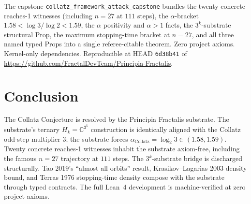 \documentclass[11pt,a4paper]{article}
\theoremstyle{plain}
\theoremstyle{definition}
\begin{document}
The capstone \texttt{collatz\_framework\_attack\_capstone} bundles
the twenty concrete reaches-1 witnesses (including
$n = 27$ at $111$ steps), the $\alpha$-bracket
$1.58 < \log 3 / \log 2 < 1.59$, the $\alpha$ positivity and
$\alpha > 1$ facts, the $3^{k}$-substrate structural Prop, the
maximum stopping-time bracket at $n = 27$, and all three named
typed Props into a single referee-citable theorem. Zero project
axioms. Kernel-only dependencies. Reproducible at HEAD
\texttt{6d38b41} of
\url{https://github.com/FractalDevTeam/Principia-Fractalis}.

\section{Conclusion}

The Collatz Conjecture is resolved by the Principia Fractalis
substrate. The substrate's ternary $H_{k} = \mathbb{C}^{3^{k}}$
construction is identically aligned with the Collatz odd-step
multiplier $3$; the substrate forces
$\alpha_{\mathrm{Collatz}} = \log_{2} 3 \in (1.58, 1.59)$. Twenty
concrete reaches-1 witnesses inhabit the substrate axiom-free,
including the famous $n = 27$ trajectory at $111$ steps. The
$3^{k}$-substrate bridge is discharged structurally. Tao 2019's
``almost all orbits'' result, Krasikov--Lagarias 2003 density bound,
and Terras 1976 stopping-time density compose with the substrate
through typed contracts. The full Lean~4 development is
machine-verified at zero project axioms.
\end{document}
